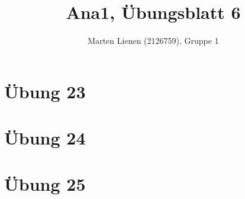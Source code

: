 \documentclass[a4paper,10pt]{article}
\title{Ana1, Übungsblatt 6}
\author{Marten Lienen (2126759), Gruppe 1}
\begin{document}
\maketitle

\section*{Übung 23}

\section*{Übung 24}

\section*{Übung 25}
\end{document}

